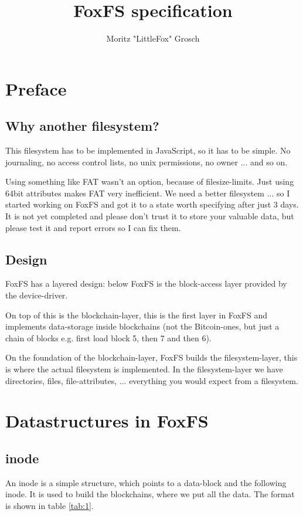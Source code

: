 \documentclass[a4paper,12pt]{article}
\author{Moritz "LittleFox" Grosch}
\title{FoxFS specification}
\begin{document}
	\maketitle
	\tableofcontents
	
	\setlength{\parskip}{11pt}

	\section{Preface}	
		\subsection{Why another filesystem?}
			This filesystem has to be implemented in JavaScript, so it has to be simple. No journaling, no access control lists, no unix permissions, no owner ... and so on.
			
			Using something like FAT wasn't an option, because of filesize-limits. Just using 64bit attributes makes FAT very inefficient. We need a better filesystem ... so I started working on FoxFS and got it to a state worth specifying after just 3 days. It is not yet completed and please don't trust it to store your valuable data, but please test it and report errors so I can fix them.
			
		\subsection{Design}
			FoxFS has a layered design: below FoxFS is the block-access layer provided by the device-driver.
			
			On top of this is the blockchain-layer, this is the first layer in FoxFS and implements data-storage inside blockchains (not the Bitcoin-ones, but just a chain of blocks e.g. first load block 5, then 7 and then 6).
			
			On the foundation of the blockchain-layer, FoxFS builds the filesystem-layer, this is where the actual filesystem is implemented. In the filesystem-layer we have directories, files, file-attributes, ... everything you would expect from a filesystem.
	
	\section{Datastructures in FoxFS}
		\subsection{inode}
			An inode is a simple structure, which points to a data-block and the following inode. It is used to build the blockchains, where we put all the data. The format is shown in table \ref{tab:1}.
			
\end{document}
